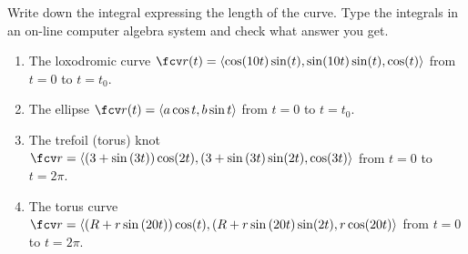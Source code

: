 Write down the integral expressing the length of the curve. Type the integrals in an on-line computer algebra system and check what answer you get.

\begin{enumerate}
\item The loxodromic curve $\fcv r(t)= \langle \cos (10t) \sin (t), \sin (10t)\sin (t), \cos (t) \rangle$ from $t=0$ to $t=t_0$.
\item The ellipse $\fcv r(t) = \langle a\cos t, b\sin t \rangle $ from $t=0$ to $t=t_0$.
\item The trefoil (torus) knot
$\fcv r=\langle \left( 3+\sin \left(3t\right)\right) \cos (2t) ,(3+\sin \left( 3t \right) \sin (2t) ,\cos (3t)\rangle 
$
from $t=0$ to $t=2\pi$.
\item The torus curve
$\fcv r=\langle \left( R+r\sin \left(20t\right)\right) \cos (t) ,(R+r\sin \left( 20t \right) \sin (2t) ,r\cos (20t)\rangle 
$
from $t=0$ to $t=2\pi$.
\end{enumerate}